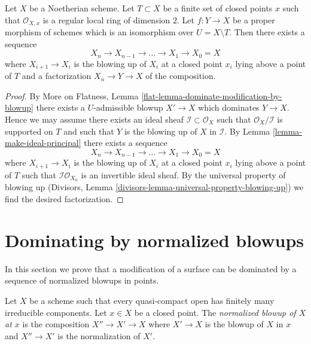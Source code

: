 \begin{lemma}
\label{lemma-dominate-by-blowing-up-in-points}
Let $X$ be a Noetherian scheme. Let $T \subset X$ be a finite set of
closed points $x$ such that $\mathcal{O}_{X, x}$ is a regular local
ring of dimension $2$. Let $f : Y \to X$ be a proper morphism of
schemes which is an isomorphism over $U = X \setminus T$.
Then there exists a sequence
$$
X_n \to X_{n - 1} \to \ldots \to X_1 \to X_0 = X
$$
where $X_{i + 1} \to X_i$ is the blowing up of $X_i$ at a closed
point $x_i$ lying above a point of $T$ and a factorization $X_n \to Y \to X$
of the composition.
\end{lemma}

\begin{proof}
By More on Flatness, Lemma \ref{flat-lemma-dominate-modification-by-blowup} 
there exists a $U$-admissible blowup $X' \to X$ which dominates
$Y \to X$. Hence we may assume there exists an ideal sheaf
$\mathcal{I} \subset \mathcal{O}_X$ such that
$\mathcal{O}_X/\mathcal{I}$ is supported on $T$ and such that
$Y$ is the blowing up of $X$ in $\mathcal{I}$.
By Lemma \ref{lemma-make-ideal-principal} 
there exists a sequence
$$
X_n \to X_{n - 1} \to \ldots \to X_1 \to X_0 = X
$$
where $X_{i + 1} \to X_i$ is the blowing up of $X_i$ at a closed
point $x_i$ lying above a point of $T$ such that
$\mathcal{I}\mathcal{O}_{X_n}$ is an invertible ideal sheaf.
By the universal property of blowing up
(Divisors, Lemma
\ref{divisors-lemma-universal-property-blowing-up})
we find the desired factorization.
\end{proof}





\section{Dominating by normalized blowups}
\label{section-normalized-blowups}

\noindent
In this section we prove that a modification of a surface can be dominated
by a sequence of normalized blowups in points.

\begin{definition}
\label{definition-normalized-blowup}
Let $X$ be a scheme such that every quasi-compact open has finitely
many irreducible components. Let $x \in X$ be a closed point.
The {\it normalized blowup of $X$ at $x$} is the composition
$X'' \to X' \to X$ where $X' \to X$ is the blowup
of $X$ in $x$ and $X'' \to X'$ is the normalization of $X'$.
\end{definition}

